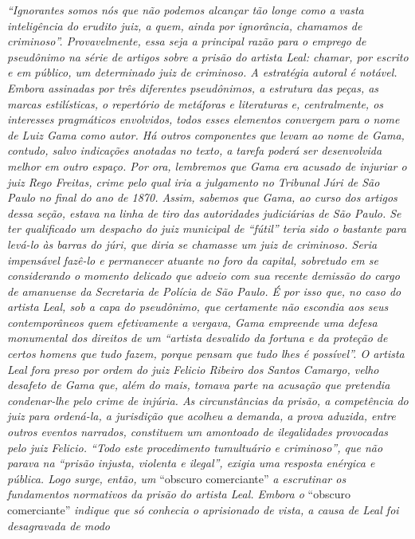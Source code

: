 \begin{argumento}
\emph{``Ignorantes somos nós que não podemos alcançar tão longe como a
vasta inteligência do erudito juiz, a quem, ainda por ignorância,
chamamos de criminoso''. Provavelmente, essa seja a principal razão para
o emprego de pseudônimo na série de artigos sobre a prisão do artista
Leal: chamar, por escrito e em público, um determinado juiz de
criminoso. A estratégia autoral é notável. Embora assinadas por três
diferentes pseudônimos, a estrutura das peças, as marcas estilísticas, o
repertório de metáforas e literaturas e, centralmente, os interesses
pragmáticos envolvidos, todos esses elementos convergem para o nome de
Luiz Gama como autor. Há outros componentes que levam ao nome de Gama,
contudo, salvo indicações anotadas no texto, a tarefa poderá ser
desenvolvida melhor em outro espaço. Por ora, lembremos que Gama era
acusado de injuriar o juiz Rego Freitas, crime pelo qual iria a
julgamento no Tribunal Júri de São Paulo no final do ano de 1870. Assim,
sabemos que Gama, ao curso dos artigos dessa seção, estava na linha de
tiro das autoridades judiciárias de São Paulo. Se ter qualificado um
despacho do juiz municipal de ``fútil'' teria sido o bastante para levá-lo
às barras do júri, que diria se chamasse um juiz de criminoso. Seria
impensável fazê-lo e permanecer atuante no foro da capital, sobretudo em
se considerando o momento delicado que adveio com sua recente demissão
do cargo de amanuense da Secretaria de Polícia de São Paulo. É por isso
que, no caso do artista Leal, sob a capa do pseudônimo, que certamente
não escondia aos seus contemporâneos quem efetivamente a vergava, Gama
empreende uma defesa monumental dos direitos de um ``artista desvalido da
fortuna e da proteção de certos homens que tudo fazem, porque pensam que
tudo lhes é possível''. O artista Leal fora preso por ordem do juiz
Felicio Ribeiro dos Santos Camargo, velho desafeto de Gama que, além do
mais, tomava parte na acusação que pretendia condenar-lhe pelo crime de
injúria. As circunstâncias da prisão, a competência do juiz para
ordená-la, a jurisdição que acolheu a demanda, a prova aduzida, entre
outros eventos narrados, constituem um amontoado de ilegalidades
provocadas pelo juiz Felicio. ``Todo este procedimento tumultuário
e criminoso'', que não parava na ``prisão injusta, violenta e ilegal'',
exigia uma resposta enérgica e pública. Logo surge, então, um} ``obscuro
comerciante'' \emph{a escrutinar os fundamentos normativos da prisão do
artista Leal. Embora o} ``obscuro comerciante'' \emph{indique que só
conhecia o aprisionado de vista, a causa de Leal foi desagravada de modo
}
\end{argumento}
